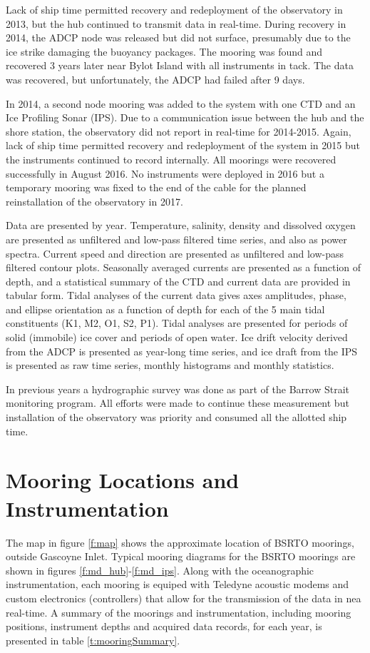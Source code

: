 \documentclass[12pt]{dforeport}
\begin{document}
Lack of ship time permitted recovery and redeployment of the observatory in 2013, but the hub continued to transmit data in real-time. During recovery in 2014, the ADCP node was released but did not surface, presumably due to the ice strike damaging the buoyancy packages. The mooring was found and recovered 3 years later near Bylot Island with all instruments in tack. The data was recovered, but unfortunately, the ADCP had failed after 9 days.

In 2014, a second node mooring was added to the system with one CTD and an Ice Profiling Sonar (IPS). Due to a communication issue between the hub and the shore station, the observatory did not report in real-time for 2014-2015. Again, lack of ship time permitted recovery and redeployment of the system in 2015 but the instruments continued to record internally.  All moorings were recovered successfully in August 2016. No instruments were deployed in 2016 but a temporary mooring was fixed to the end of the cable for the planned reinstallation of the observatory in 2017.

Data are presented by year.  Temperature, salinity, density and dissolved oxygen are presented as unfiltered and low-pass filtered time series, and also as power spectra. Current speed and direction are presented as unfiltered and low-pass filtered contour plots.  Seasonally averaged currents are presented as a function of depth, and a statistical summary of the CTD and current data are provided in tabular form.  Tidal analyses of the current data gives axes amplitudes, phase, and ellipse orientation as a function of depth for each of the 5 main tidal constituents (K1, M2, O1, S2, P1).  Tidal analyses are presented for periods of solid (immobile) ice cover and periods of open water. Ice drift velocity derived from the ADCP is presented as year-long time series, and ice draft from the IPS is presented as raw time series, monthly histograms and monthly statistics.

In previous years a hydrographic survey was done as part of the Barrow Strait monitoring program. All efforts were made to continue these measurement but installation of the observatory was priority and consumed all the allotted ship time.

\section{Mooring Locations and Instrumentation}

The map in figure \ref{f:map} shows the approximate location of BSRTO moorings, outside Gascoyne Inlet. Typical mooring diagrams for the BSRTO moorings are shown in figures \ref{f:md_hub}-\ref{f:md_ips}.  Along with the oceanographic instrumentation, each mooring is equiped with Teledyne acoustic modems and custom electronics (controllers) that allow for the transmission of the data in nea real-time.  A summary of the moorings and instrumentation, including mooring positions, instrument depths and acquired data records, for each year, is presented in table \ref{t:mooringSummary}.
  
\end{document}
